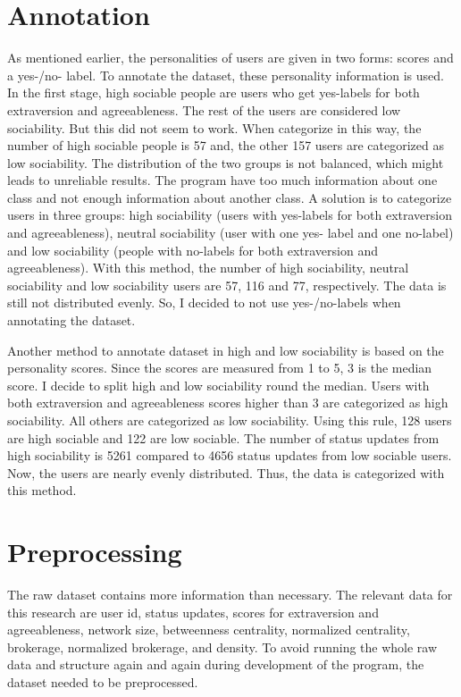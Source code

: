 \documentclass[
10pt, %
a4paper, %
oneside, %
headinclude,footinclude, %
] {book}%
\begin{document}
\section{Annotation}
As mentioned earlier, the personalities of users are given in two forms: scores and a yes-/no- label. To annotate the dataset, these personality information is used. In the first stage, high sociable people are users who get yes-labels for both extraversion and agreeableness. The rest of the users are considered low sociability. But this did not seem to work. When categorize in this way, the number of high sociable people is 57 and, the other 157 users are categorized as low sociability. The distribution of the two groups is not balanced, which might leads to unreliable results. The program have too much information about one class and not enough information about another class. A solution is to categorize users in three groups: high sociability (users with yes-labels for both extraversion and agreeableness), neutral sociability (user with one yes- label and one no-label) and low sociability (people with no-labels for both extraversion and agreeableness). With this method, the number of high sociability, neutral sociability and low sociability users are 57, 116 and 77, respectively. The data is still not distributed evenly. So, I decided to not use yes-/no-labels when annotating the dataset.

Another method to annotate dataset in high and low sociability is based on the personality scores. Since the scores are measured from 1 to 5, 3 is the median score. I decide to split high and low sociability round the median. Users with both extraversion and agreeableness scores higher than 3 are categorized as high sociability. All others are categorized as low sociability. Using this rule, 128 users are high sociable and 122 are low sociable. The number of status updates from high sociability is 5261 compared to 4656 status updates from low sociable users. Now, the users are nearly evenly distributed. Thus, the data is categorized with this method.

\section{Preprocessing}

The raw dataset contains more information than necessary. The relevant data for this research are user id, status updates, scores for extraversion and agreeableness, network size, betweenness centrality, normalized centrality, brokerage, normalized brokerage, and density. To avoid running the whole raw data and structure again and again during development of the program, the dataset needed to be preprocessed. 
\end{document}
